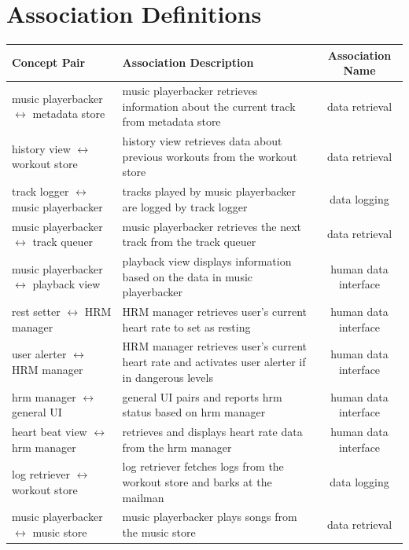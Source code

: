 \documentclass[letterpaper,english, 12pt]{scrreprt}
\begin{document}
    \section{Association Definitions}
		
		\begin{center}
			\renewcommand{\arraystretch}{1.5}
	        \begin{tabular}{| m{} | m{} | c |}
	            \hline
	            Concept Pair & Association Description & Association Name\\
	            \hline
	            music playerbacker $\leftrightarrow$ metadata store & music playerbacker retrieves information about the current track from metadata store & data retrieval\\
				\hline
	            history view $\leftrightarrow$ workout store & history view retrieves data about previous workouts from the workout store & data retrieval\\
				\hline
	            track logger $\leftrightarrow$ music playerbacker & tracks played by music playerbacker are logged by track logger & data logging\\
				\hline
	            music playerbacker $\leftrightarrow$ track queuer & music playerbacker retrieves the next track from the track queuer & data retrieval\\
				\hline
	            music playerbacker $\leftrightarrow$ playback view & playback view displays information based on the data in music playerbacker & human data interface\\
				\hline
		    rest setter $\leftrightarrow$ HRM manager & HRM manager retrieves user's current heart rate to set as resting & human data interface\\
				\hline
		    user alerter $\leftrightarrow$ HRM manager & HRM manager retrieves user's current heart rate and activates user alerter if in dangerous levels & human data interface\\
				\hline
	            hrm manager $\leftrightarrow$ general UI & general UI pairs and reports hrm status based on hrm manager & human data interface\\
				\hline
	            heart beat view $\leftrightarrow$ hrm manager & retrieves and displays heart rate data from the hrm manager & human data interface\\
				\hline
	            log retriever $\leftrightarrow$ workout store & log retriever fetches logs from the workout store and barks at the mailman & data logging\\
				\hline
	            music playerbacker $\leftrightarrow$ music store & music playerbacker plays songs from the music store & data retrieval\\
				\hline
	        \end{tabular}
		\end{center}
\end{document}
